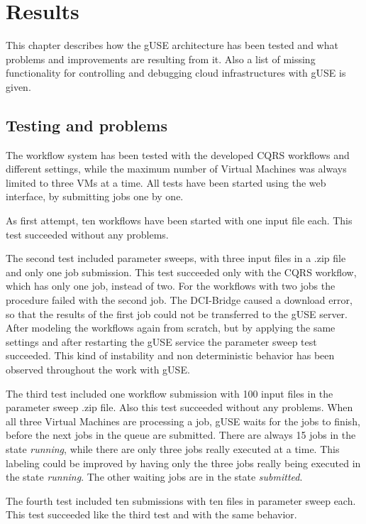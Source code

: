 \section{Results}\label{results}

This chapter describes how the gUSE architecture has been tested and what problems and improvements are resulting from it.
Also a list of missing functionality for controlling and debugging cloud infrastructures with gUSE is given.

\subsection{Testing and problems}\label{testing}

The workflow system has been tested with the developed CQRS workflows and different settings, while the maximum number of Virtual Machines was always limited to three VMs at a time.
All tests have been started using the web interface, by submitting jobs one by one.

As first attempt, ten workflows have been started with one input file each.
This test succeeded without any problems.

The second test included parameter sweeps, with three input files in a .zip file and only one job submission.
This test succeeded only with the CQRS workflow, which has only one job, instead of two.
For the workflows with two jobs the procedure failed with the second job.
The DCI-Bridge caused a download error, so that the results of the first job could not be transferred to the gUSE server.
After modeling the workflows again from scratch, but by applying the same settings and after restarting the gUSE service the parameter sweep test succeeded.
This kind of instability and non deterministic behavior has been observed throughout the work with gUSE.

The third test included one workflow submission with 100 input files in the parameter sweep .zip file.
Also this test succeeded without any problems.
When all three Virtual Machines are processing a job, gUSE waits for the jobs to finish, before the next jobs in the queue are submitted.
There are always 15 jobs in the state \textit{running}, while there are only three jobs really executed at a time.
This labeling could be improved by having only the three jobs really being executed in the state \textit{running}.
The other waiting jobs are in the state \textit{submitted}.

The fourth test included ten submissions with ten files in parameter sweep each.
This test succeeded like the third test and with the same behavior.

